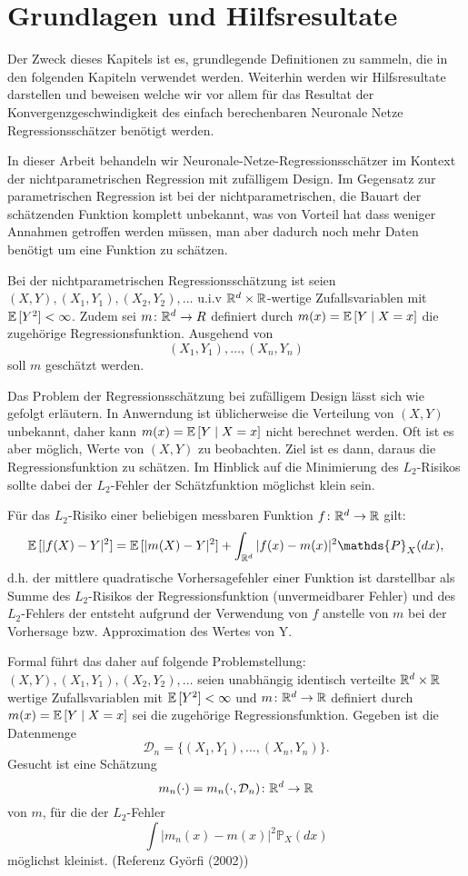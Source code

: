 \chapter{Grundlagen und Hilfsresultate}
\label{chap:1}

Der Zweck dieses Kapitels ist es, grundlegende Definitionen zu sammeln, die in den folgenden Kapiteln verwendet werden. Weiterhin werden wir Hilfsresultate darstellen und beweisen welche wir vor allem für das Resultat der Konvergenzgeschwindigkeit des einfach berechenbaren Neuronale Netze Regressionsschätzer benötigt werden.

In dieser Arbeit behandeln wir Neuronale-Netze-Regressionsschätzer im Kontext der nichtparametrischen Regression mit zufälligem Design. Im Gegensatz zur parametrischen Regression ist bei der nichtparametrischen, die Bauart der schätzenden Funktion komplett unbekannt, was von Vorteil hat dass weniger Annahmen getroffen werden müssen, man aber dadurch noch mehr Daten benötigt um eine Funktion zu schätzen.

Bei der nichtparametrischen Regressionsschätzung ist seien $(X, Y), (X_1, Y_1), (X_2, Y_2), \dots$ u.i.v $\mathbb{R}^d \times \mathbb{R}$-wertige Zufallsvariablen mit $\mathbb{E}\,[Y^2] < \infty$. Zudem sei $m\colon \mathbb{R}^d \to R$ definiert durch $m(x) = \mathbb{E}\,[Y \mid X = x]$ die zugehörige Regressionsfunktion. Ausgehend von 
$$ (X_1, Y_1),\dots,(X_n, Y_n)$$ 
soll $m$ geschätzt werden.

Das Problem der Regressionsschätzung bei zufälligem Design lässt sich wie gefolgt erläutern. In Anwerndung ist üblicherweise die Verteilung von $(X, Y)$ unbekannt, daher kann $m(x) = \mathbb{E}\,[Y \mid X = x]$ nicht berechnet werden. Oft ist es aber möglich, Werte von $(X, Y)$ zu beobachten. Ziel ist es dann, daraus die Regressionsfunktion zu schätzen. Im Hinblick auf die Minimierung des $L_2$-Risikos sollte dabei der $L_2$-Fehler der Schätzfunktion möglichst klein sein. 

Für das $L_2$-Risiko einer beliebigen messbaren Funktion $f\colon \mathbb{R}^d \to \mathbb{R}$  gilt$\colon$
$$\E[|f(X) - Y|^2] = \E[|m(X) - Y|^2] + \int_{\R^d}|f(x) - m(x)|^2 \mathds{P}_X (dx),$$
d.h. der mittlere quadratische Vorhersagefehler einer Funktion ist darstellbar als Summe des $L_2$-Risikos der Regressionsfunktion (unvermeidbarer Fehler) und des $L_2$-Fehlers der entsteht aufgrund der Verwendung von $f$ anstelle von $m$ bei der Vorhersage bzw. Approximation des Wertes von Y.

Formal führt das daher auf folgende Problemstellung$\colon$
$(X, Y), (X_1, Y_1), (X_2, Y_2), \dots$ seien unabhängig identisch verteilte $\mathbb{R}^d \times \mathbb{R}$ wertige Zufallsvariablen mit $\mathbb{E}\,[Y^2] < \infty$ und $m\colon\mathbb{R}^d \to \mathbb{R}$ definiert durch $m(x) = \mathbb{E}\,[Y \mid X = x]$ sei die zugehörige Regressionsfunktion. Gegeben ist die Datenmenge 
$$ \mathcal{D}_n = \{(X_1, Y_1),\dots,(X_n, Y_n)\}.$$
Gesucht ist eine Schätzung 
$$m_n(\cdot) = m_n(\cdot, \mathcal{D}_n)\colon\mathbb{R}^d \to \mathbb{R} $$
von $m$, für die der $L_2$-Fehler 
$$\int |m_n(x) - m(x)|^2 \mathds{P}_X(dx)$$
möglichst \glqq klein\grqq ist. (Referenz Györfi (2002))


